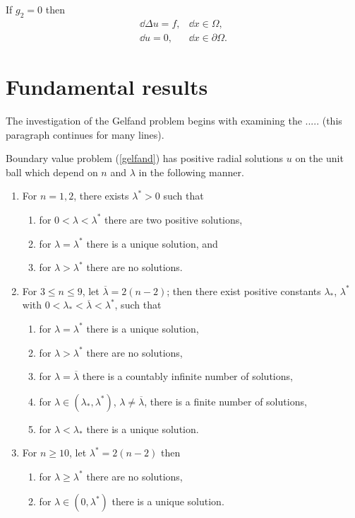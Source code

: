 \begin{cor}
If $g_2 = 0$ then
$$
\begin{array}{lr}
\dd \Delta u = f, & \dd x\in\Omega ,\\[8pt]
\dd u =  0, & \dd x\in\partial\Omega .
\end{array}
$$
\end{cor}


\section{Fundamental results}
The investigation of the Gelfand problem begins with examining the
..... (this paragraph continues for many lines).

%
%
\begin{thrm}
Boundary value problem (\ref{gelfand}) has positive radial
solutions $u$ on the unit ball which depend on $n$ and $\lambda$
in the following manner.
\begin{enumerate}
\item For $n=1,2$, there exists $\lambda^* >0$ such that
\begin{enumerate}
\item for $0< \lambda < \lambda^*$ there are two positive
solutions,
\item for $\lambda =\lambda^*$ there is a unique solution, and
\item for $\lambda > \lambda^*$ there are no solutions.
\end{enumerate}
\item For $3\leq n \leq 9$, let $\overline{\lambda}=2(n-2)$; then
there exist positive constants $\lambda_*$, $\lambda^*$ with
$0< \lambda_* < \overline{\lambda} < \lambda^*$, such that
\begin{enumerate}
\item for $\lambda = \lambda^*$ there is a unique solution,
\item for $\lambda > \lambda^*$ there are no solutions,
\item for $\lambda = \overline{\lambda}$ there is a countably infinite number
of solutions,
\item for $\lambda \in (\lambda_*,\lambda^*)$, $\lambda \neq
\overline{\lambda}$, there is a finite number of solutions,
\item for $\lambda < \lambda_*$ there is a unique solution.
\end{enumerate}
\item For $n\geq 10$, let $\lambda^* = 2(n-2)$ then
\begin{enumerate}
\item for $\lambda \geq \lambda^*$ there are no solutions,
\item for $\lambda \in (0,\lambda^*)$ there is a unique solution.
\end{enumerate}
\end{enumerate}
\end{thrm}

